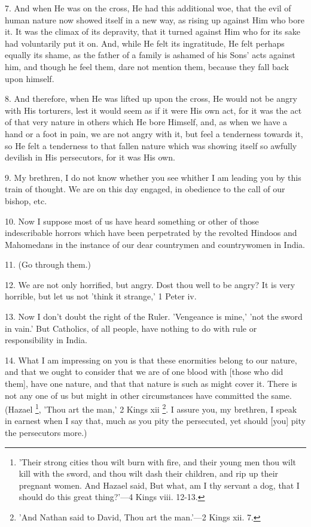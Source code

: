 7. And when He was on the cross, He had this
additional woe, that the evil of human nature now showed itself in a
new way, as rising up against Him who bore it. It was the climax of
its depravity, that it turned against Him who for its sake had
voluntarily put it on. And, while He felt its ingratitude, He felt
perhaps equally its shame, as the father of a family is ashamed of his
Sons' acts against him, and though he feel them, dare not mention
them, because they fall back upon himself.

8. And therefore, when He was lifted up upon the
cross, He would not be angry with His torturers, lest it would seem as
if it were His own act, for it was the act of that very nature in
others which He bore Himself, and, as when we have a hand or a foot in
pain, we are not angry with it, but feel a tenderness towards it, so
He felt a tenderness to that fallen nature which was showing itself so
awfully devilish in His persecutors, for it was His own.

9. My brethren, I do not know whether you see
whither I am leading you by this train of thought. We are on
this day engaged, in obedience to the call of our bishop, etc.

10. Now I suppose most of us have heard something
or other of those indescribable horrors which have been perpetrated by
the revolted Hindoos and Mahomedans in the instance of our dear
countrymen and countrywomen in India.

11. (Go through them.)

12. We are not only horrified, but angry. Dost
thou well to be angry? It is very horrible, but let us not 'think it
strange,' 1 Peter iv.

13. Now I don't doubt the right of the Ruler.
'Vengeance is mine,' 'not the sword in vain.' But Catholics, of all
people, have nothing to do with rule or responsibility in India.

14. What I am impressing on you is that these
enormities belong to our nature, and that we ought to consider that we
are of one blood with [those who did them], have one nature, and that
that nature is such as might cover it. There is not any one of us but
might in other circumstances have committed the same. (Hazael \footnote{'Their strong cities thou
wilt burn with fire, and their young men thou wilt kill with the
sword, and thou wilt dash their children, and rip up their pregnant
women. And Hazael said, But what, am I thy servant a dog, that I
should do this great thing?'—4 Kings viii. 12-13.}, 'Thou art the man,' 2 Kings xii \footnote{'And Nathan said to David,
Thou art the man.'—2 Kings xii. 7.}. I assure you, my brethren, I speak in earnest when I say that,
much as you pity the persecuted, yet should [you] pity the persecutors
more.)


